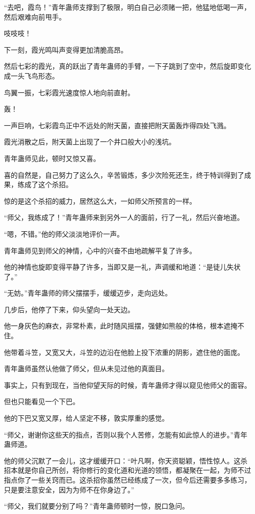 \begin{this_body}
“去吧，霞鸟！”青年蛊师支撑到了极限，明白自己必须赌一把，他猛地低喝一声，然后艰难向前甩手。

吱吱吱！

下一刻，霞光鸣叫声变得更加清脆高昂。

然后七彩的霞光，真的跃出了青年蛊师的手臂，一下子跳到了空中，然后旋即变化成一头飞鸟形态。

鸟翼一振，七彩霞光速度惊人地向前直射。

轰！

一声巨响，七彩霞鸟正中不远处的附天菌，直接把附天菌轰炸得四处飞溅。

霞光消散之后，附天菌上出现了一个井口般大小的浅坑。

青年蛊师见此，顿时又惊又喜。

喜的自然是，自己努力了这么久，辛苦锻炼，多少次险死还生，终于特训得到了成果，练成了这个杀招。

惊的是这个杀招的威力，居然这么大，一如师父所预言的一样。

“师父，我练成了！”青年蛊师来到另外一人的面前，行了一礼，然后兴奋地道。

“嗯，不错。”他的师父淡淡地评价一声。

青年蛊师见到师父的神情，心中的兴奋不由地疏解平复了许多。

他的神情也旋即变得平静了许多，当即又是一礼，声调缓和地道：“是徒儿失状了。”

“无妨。”青年蛊师的师父摆摆手，缓缓迈步，走向远处。

几步后，他停了下来，仰头望向一处天边。

他一身灰色的麻衣，非常朴素，此时随风摇摆，强健如熊般的体格，根本遮掩不住。

他带着斗笠，又宽又大，斗笠的边沿在他脸上投下浓重的阴影，遮住他的面庞。

青年蛊师虽然认他做了师父，但从未见过他的真面目。

事实上，只有到现在，当他仰望天际的时候，青年蛊师才得以窥见他师父的面容。

但也只能看见一个下巴。

他的下巴又宽又厚，给人坚定不移，敦实厚重的感觉。

“师父，谢谢你这些天的指点，否则以我个人苦修，怎能有如此惊人的进步。”青年蛊师道。

他的师父沉默了一会儿，这才缓缓开口：“叶凡啊，你天资聪颖，悟性惊人。这杀招本就是你自己所创，将你修行的变化道和光道的领悟，都凝聚在一起，为师不过指点你了一些关窍而已。这杀招你虽然已经练成了一次，但今后还需要多多练习，只是要注意安全，因为为师不在你身边了。”

“师父，我们就要分别了吗？”青年蛊师顿时一惊，脱口急问。


\end{this_body}
